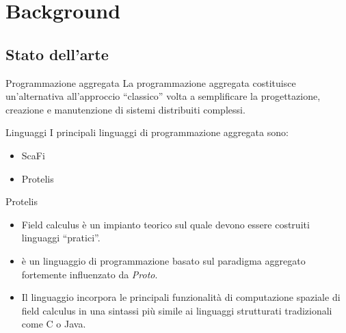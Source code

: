 \section{Background}
    \subsection{Stato dell'arte}

    \begin{frame}{\insertsectionhead}{\insertsubsectionhead}

      \begin{block}{Programmazione aggregata} %
        La programmazione aggregata costituisce un'alternativa all'approccio ``classico'' volta a semplificare la progettazione, creazione e manutenzione di sistemi distribuiti complessi.
      \end{block}

      \pause

      \begin{block}{Linguaggi} %
        I principali linguaggi di programmazione aggregata sono:

        \begin{itemize}[<+(1)->]
          \item ScaFi
          \item Protelis
        \end{itemize}
      \end{block}

    \end{frame}

    \begin{frame}{\insertsectionhead}{\insertsubsectionhead}


      \begin{block}{Protelis}
        \begin{itemize}[<+->]
          \item Field calculus è un impianto teorico sul quale devono essere costruiti linguaggi ``pratici''.
          \item {} è un linguaggio di programmazione basato sul paradigma aggregato fortemente influenzato da \emph{Proto}.
          \item Il linguaggio incorpora le principali funzionalità di computazione spaziale di field calculus in una sintassi più simile ai linguaggi strutturati tradizionali come C o Java.
        \end{itemize}
      \end{block}
    \end{frame}

